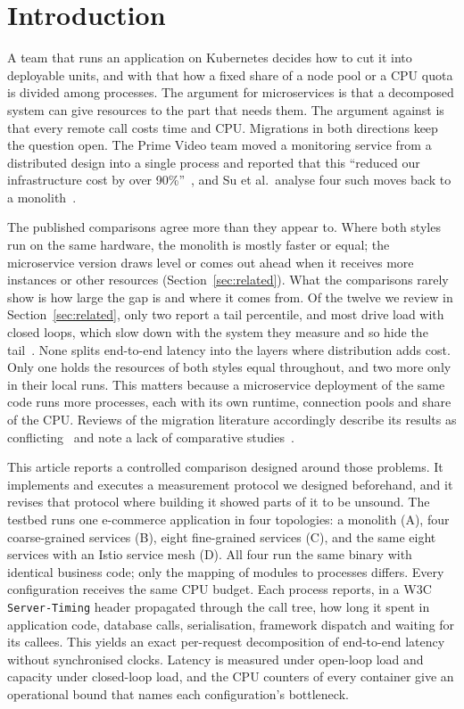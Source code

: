 \section{Introduction}
\label{sec:intro}

A team that runs an application on Kubernetes decides how to cut it into deployable units, and with that how a
fixed share of a node pool or a CPU quota is divided among processes. The argument for microservices is that a
decomposed system can give resources to the part that needs them. The argument against is that every remote call
costs time and CPU. Migrations in both directions keep the question open. The Prime Video team moved a monitoring
service from a distributed design into a single process and reported that this ``reduced our infrastructure cost
by over 90\%''~\cite{Kolny2023}, and Su et al.\ analyse four such moves back to a monolith~\cite{Su2024}.

The published comparisons agree more than they appear to. Where both styles run on the same hardware, the
monolith is mostly faster or equal; the microservice version draws level or comes out ahead when it receives more
instances or other resources (Section~\ref{sec:related}). What the comparisons rarely show is how large the gap is and where it comes from. Of the twelve we
review in Section~\ref{sec:related}, only two report a tail percentile, and most drive load with closed loops,
which slow down with the system they measure and so hide the tail~\cite{Schroeder2006,Tene2015}. None splits
end-to-end latency into the layers where distribution adds cost. Only one holds the resources of both styles equal throughout, and two more only in their local runs. This
matters because a microservice deployment of the same code runs more processes, each with its own runtime,
connection pools and share of the CPU. Reviews of the migration literature accordingly describe its results as
conflicting~\cite{Rodrigues2024} and note a lack of comparative studies~\cite{RodriguesJSS2025}.

This article reports a controlled comparison designed around those problems. It implements and executes a
measurement protocol we designed beforehand, and it revises that protocol where building it showed parts of it to be unsound. The testbed runs one e-commerce application in four topologies: a monolith (A), four
coarse-grained services (B), eight fine-grained services (C), and the same eight services with an Istio service
mesh (D). All four run the same binary with identical business code; only the mapping of modules to processes
differs. Every configuration receives the same CPU budget. Each process reports, in a W3C \texttt{Server-Timing}
header propagated through the call tree, how long it spent in application code, database calls, serialisation,
framework dispatch and waiting for its callees. This yields an exact per-request decomposition of end-to-end
latency without synchronised clocks. Latency is measured under open-loop load and capacity under closed-loop load, and the CPU counters
of every container give an operational bound that names each configuration's bottleneck.

